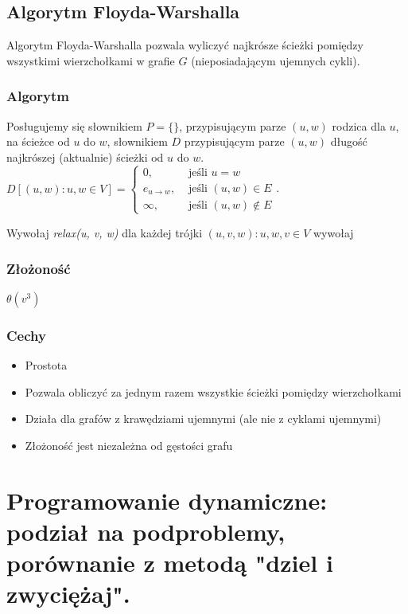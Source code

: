 \documentclass[12pt]{article}
\begin{document}
    \subsection{Algorytm Floyda-Warshalla}

    Algorytm Floyda-Warshalla pozwala wyliczyć najkrósze ścieżki pomiędzy wszystkimi
    wierzchołkami w grafie $G$ (nieposiadającym ujemnych cykli).

    \subsubsection{Algorytm}

    Posługujemy się słownikiem $P = \{\}$, przypisującym parze $(u, w)$ rodzica dla $u$,
    na ścieżce od $u$ do $w$, słownikiem $D$ przypisującym parze $(u, w)$ długość
    najkrószej (aktualnie) ścieżki od $u$ do $w$.\\
    $D[(u, w) : u, w \in V] =
    \begin{cases}
        0, &\text{ jeśli } u = w\\
        e_{u \rightarrow w}, &\text{ jeśli } (u, w) \in E\\
        \infty, &\text{ jeśli } (u, w) \notin E
    \end{cases}$.
    \[\]

    Wywołaj  \textit{relax(u, v, w)} dla każdej trójki $(u, v, w) : u, w, v \in V$ wywołaj
    \subsubsection{Złożoność}
    $\theta(v^3)$

    \subsubsection{Cechy}
    \begin{itemize}
        \item Prostota
        \item Pozwala obliczyć za jednym razem wszystkie ścieżki pomiędzy wierzchołkami
        \item Działa dla grafów z krawędziami ujemnymi (ale nie z cyklami ujemnymi)
        \item Złożoność jest niezależna od gęstości grafu
    \end{itemize}

    \section{Programowanie dynamiczne: podział na podproblemy, porównanie z metodą "dziel i zwyciężaj".}
\end{document}

